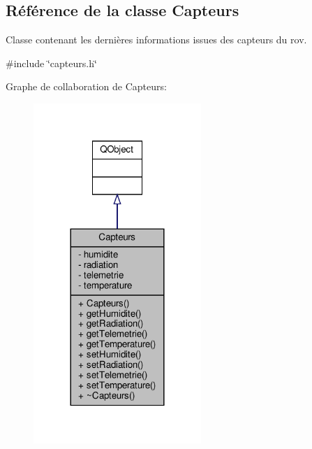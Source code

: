 \hypertarget{class_capteurs}{}\subsection{Référence de la classe Capteurs}
\label{class_capteurs}


Classe contenant les dernières informations issues des capteurs du rov.  




{\ttfamily \#include \char`\"{}capteurs.\+h\char`\"{}}



Graphe de collaboration de Capteurs\+:
\nopagebreak
\begin{figure}[H]
\begin{center}
\leavevmode
\includegraphics[width=180pt]{class_capteurs__coll__graph}
\end{center}
\end{figure}
